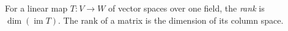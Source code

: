 
For a linear map $T:V\to W$ of vector spaces over one field, the \emph{rank} is $\dim(\operatorname{im}T)$. The rank of a matrix is the dimension of its column space.

